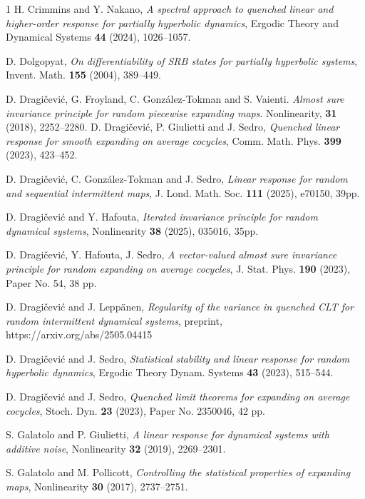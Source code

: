 \documentclass[11pt,reqno,a4paper]{article}
\theoremstyle{special}
\begin{document}
\begin{thebibliography}{1}
 H. Crimmins and Y. Nakano, \emph{A spectral approach to quenched linear and higher-order response for partially hyperbolic dynamics}, Ergodic Theory and Dynamical Systems \textbf{44} (2024), 1026--1057.



 D. Dolgopyat, \emph{On differentiability of SRB states for partially hyperbolic systems}, Invent. Math. \textbf{155} (2004), 389--449. 

  
D. Dragi\v cevi\' c, G. Froyland, C. Gonz\'alez-Tokman and S. Vaienti. {\em Almost sure invariance principle
for random piecewise expanding maps}. Nonlinearity, \textbf{31} (2018), 2252--2280.
D. Dragi\v cevi\' c, P. Giulietti and J. Sedro, \emph{Quenched linear response for smooth expanding on average cocycles}, Comm. Math. Phys. \textbf{399} (2023), 423--452.

D. Dragi\v cevi\' c, C. Gonz\'alez-Tokman and J. Sedro, \emph{Linear response for random and sequential intermittent maps}, J. Lond. Math. Soc. \textbf{111} (2025), e70150, 39pp.

D. Dragi\v cevi\' c and Y. Hafouta, \emph{Iterated invariance principle for random dynamical systems}, Nonlinearity \textbf{38} (2025), 035016, 35pp.

D. Dragi\v cevi\' c, Y. Hafouta, J. Sedro, \emph{A vector-valued almost sure invariance principle for random expanding on average cocycles}, J. Stat. Phys. \textbf{190} (2023), Paper No. 54, 38 pp.

D. Dragi\v cevi\'c and J. Lepp{\"a}nen, \emph{Regularity of the variance in quenched CLT for random intermittent dynamical systems}, preprint, https://arxiv.org/abs/2505.04415


D. Dragi\v cevi\' c and J. Sedro, \emph{Statistical stability and linear response for random hyperbolic dynamics}, Ergodic Theory Dynam. Systems \textbf{43} (2023), 515--544.

D. Dragi\v cevi\' c and J. Sedro, \emph{Quenched limit theorems for expanding on average cocycles}, Stoch. Dyn. \textbf{23} (2023),  Paper No. 2350046, 42 pp.

 S. Galatolo and P. Giulietti, \emph{A linear response for dynamical systems with additive noise}, Nonlinearity \textbf{32} (2019), 2269--2301. 

S. Galatolo and M. Pollicott, \emph{Controlling the statistical properties of expanding maps}, Nonlinearity \textbf{30} (2017), 2737--2751.



\end{thebibliography}
\end{document}

